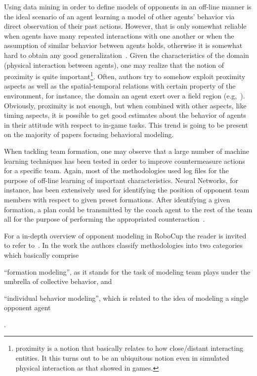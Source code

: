 Using data mining in order to define models of opponents in an off-line manner is the ideal scenario of an agent learning a model of other agents' behavior via direct observation of their past actions. However, that is only somewhat reliable when agents have many repeated interactions with one another or when the assumption of similar behavior between agents holds, otherwise it is somewhat hard to obtain any good generalization~\cite{stone2000defining}. Given the characteristics of the domain (physical interaction between agents), one may realize that the notion of proximity is quite important\footnote{proximity is a notion that basically relates to how close/distant interacting entities. It this turns out to be an ubiquitous notion even in simulated physical interaction as that showed in games.}. Often, authors try to somehow exploit proximity aspects as well as the spatial-temporal relations with certain property of the environment, for instance, the domain an agent exert over a field region (e.g,~\cite{RileyCoachin2002}). Obviously, proximity is not enough, but when combined with other aspects, like timing aspects, it is possible to get good estimates about the behavior of agents in their attitude with respect to in-game tasks. This trend is going to be present on the majority of papers focusing behavioral modeling.

When tackling team formation, one may observe that a large number of machine learning techniques has been tested in order to improve countermeasure actions for a specific team. Again, most of the methodologies used log files for the purpose of off-line learning of important characteristics. Neural Networks, for instance, has been extensively used for identifying the position of opponent team members with respect to given preset formations. After identifying a given formation, a plan could be transmitted by the coach agent to the rest of the team all for the purpose of performing the appropriated counteraction~\cite{Nakashima2010,Ramos2008, Faria2010, Visser2001}.


For a in-depth overview of opponent modeling in RoboCup the reader is invited to refer to~\cite{OppRobocup}. In the work the authors classify methodologies into two categories which basically comprise \begin{inparaenum}\item``formation modeling'', as it stands for the task of modeling team plays under the umbrella of collective behavior, and \item``individual behavior modeling'', which is related to the idea of modeling a single opponent agent\end{inparaenum}.

